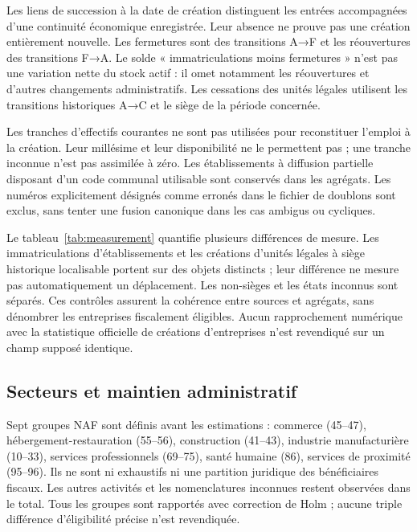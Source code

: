 Les liens de succession à la date de création distinguent les entrées accompagnées d’une continuité économique enregistrée. Leur absence ne prouve pas une création entièrement nouvelle. Les fermetures sont des transitions A→F et les réouvertures des transitions F→A. Le solde « immatriculations moins fermetures » n’est pas une variation nette du stock actif : il omet notamment les réouvertures et d’autres changements administratifs. Les cessations des unités légales utilisent les transitions historiques A→C et le siège de la période concernée.

Les tranches d’effectifs courantes ne sont pas utilisées pour reconstituer l’emploi à la création. Leur millésime et leur disponibilité ne le permettent pas ; une tranche inconnue n’est pas assimilée à zéro. Les établissements à diffusion partielle disposant d’un code communal utilisable sont conservés dans les agrégats. Les numéros explicitement désignés comme erronés dans le fichier de doublons sont exclus, sans tenter une fusion canonique dans les cas ambigus ou cycliques.

Le tableau~\ref{tab:measurement} quantifie plusieurs différences de mesure. Les immatriculations d’établissements et les créations d’unités légales à siège historique localisable portent sur des objets distincts ; leur différence ne mesure pas automatiquement un déplacement. Les non-sièges et les états inconnus sont séparés. Ces contrôles assurent la cohérence entre sources et agrégats, sans dénombrer les entreprises fiscalement éligibles. Aucun rapprochement numérique avec la statistique officielle de créations d’entreprises n’est revendiqué sur un champ supposé identique.
\begin{table}[htbp]\centering\small\caption{Objets administratifs reconstruits et différences de mesure}\label{tab:measurement}\end{table}

\subsection{Secteurs et maintien administratif}
Sept groupes NAF sont définis avant les estimations : commerce (45–47), hébergement-restauration (55–56), construction (41–43), industrie manufacturière (10–33), services professionnels (69–75), santé humaine (86), services de proximité (95–96). Ils ne sont ni exhaustifs ni une partition juridique des bénéficiaires fiscaux. Les autres activités et les nomenclatures inconnues restent observées dans le total. Tous les groupes sont rapportés avec correction de Holm ; aucune triple différence d’éligibilité précise n’est revendiquée.

